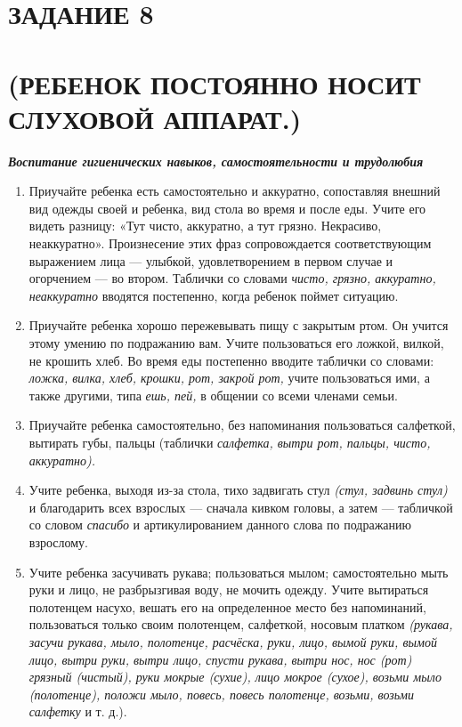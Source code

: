 \documentclass{book}
\renewcommand{\emph}[1]{\textit{#1}}
\begin{document}
\section{ЗАДАНИЕ 8}\section*{(РЕБЕНОК ПОСТОЯННО НОСИТ СЛУХОВОЙ АППАРАТ.)}

\emph{\textbf{Воспитание гигиенических навыков, самостоятельности и
трудолюбия}}


\begin{enumerate}
\def\labelenumi{\arabic{enumi}.}
\item
  
  Приучайте ребенка есть самостоятельно и аккуратно, сопоставляя внешний
  вид одежды своей и ребенка, вид стола во время и после еды. Учите его
  видеть разницу: «Тут чисто, аккуратно, а тут грязно. Некрасиво,
  неаккуратно». Произнесение этих фраз сопровождается соответствующим
  выражением лица --- улыбкой, удовлетворением в первом случае и
  огорчением --- во втором. Таблички со словами \emph{чисто, грязно,
  аккуратно, неаккуратно} вводятся постепенно, когда ребенок поймет
  ситуацию.
  
\item
  
  Приучайте ребенка хорошо пережевывать пищу с закрытым ртом. Он учится
  этому умению по подражанию вам. Учите пользоваться его ложкой, вилкой,
  не крошить хлеб. Во время еды постепенно вводите таблички со словами:
  \emph{ложка, вилка, хлеб, крошки, рот, закрой рот,} учите пользоваться
  ими, а также другими, типа \emph{ешь, пей,} в общении со всеми членами
  семьи.
  
\item
  
  Приучайте ребенка самостоятельно, без напоминания пользоваться
  салфеткой, вытирать губы, пальцы (таблички \emph{салфетка, вытри рот,
  пальцы, чисто, аккуратно).}
  
\item
  
  Учите ребенка, выходя из-за стола, тихо задвигать стул \emph{(стул,
  задвинь стул)} и благодарить всех взрослых --- сначала кивком головы,
  а затем --- табличкой со словом \emph{спасибо} и артикулированием
  данного слова по подражанию взрослому.
  
\item
  
  Учите ребенка засучивать рукава; пользоваться мылом; самостоятельно
  мыть руки и лицо, не разбрызгивая воду, не мочить одежду. Учите
  вытираться полотенцем насухо, вешать его на определенное место без
  напоминаний, пользоваться только своим полотенцем, салфеткой, носовым
  платком \emph{(рукава, засучи рукава, мыло, полотенце, расчёска, руки,
  лицо, вымой руки, вымой лицо, вытри руки, вытри лицо, спусти рукава,
  вытри нос, нос (рот) грязный (чистый), руки мокрые (сухие), лицо
  мокрое (сухое), возьми мыло (полотенце), положи мыло, повесь, повесь
  полотенце, возьми, возьми салфетку} и т. д.).
  
\end{enumerate}
\end{document}
